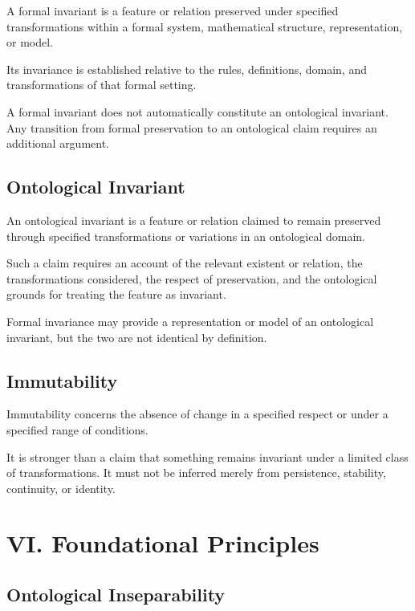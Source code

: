 A formal invariant is a feature or relation preserved under specified
transformations within a formal system, mathematical structure,
representation, or model.

Its invariance is established relative to the rules, definitions,
domain, and transformations of that formal setting.

A formal invariant does not automatically constitute an ontological
invariant. Any transition from formal preservation to an ontological
claim requires an additional argument.


\subsection*{Ontological Invariant}

An ontological invariant is a feature or relation claimed to remain
preserved through specified transformations or variations in an
ontological domain.

Such a claim requires an account of the relevant existent or relation,
the transformations considered, the respect of preservation, and
the ontological grounds for treating the feature as invariant.

Formal invariance may provide a representation or model of an
ontological invariant, but the two are not identical by definition.


\subsection*{Immutability}

Immutability concerns the absence of change in a specified respect
or under a specified range of conditions.

It is stronger than a claim that something remains invariant under
a limited class of transformations. It must not be inferred merely
from persistence, stability, continuity, or identity.



\section*{VI. Foundational Principles}


\subsection*{Ontological Inseparability}

